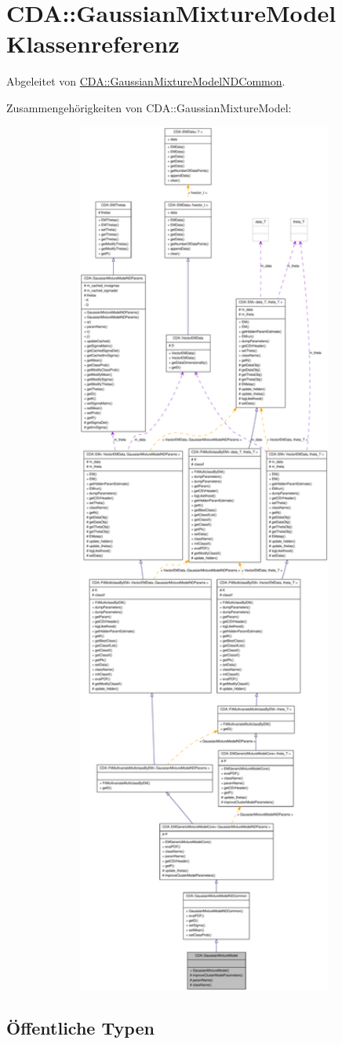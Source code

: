 \hypertarget{classCDA_1_1GaussianMixtureModel}{
\section{CDA::GaussianMixtureModel Klassenreferenz}
\label{classCDA_1_1GaussianMixtureModel}
}


Abgeleitet von \hyperlink{classCDA_1_1GaussianMixtureModelNDCommon}{CDA::GaussianMixtureModelNDCommon}.



Zusammengehörigkeiten von CDA::GaussianMixtureModel:\nopagebreak
\begin{figure}[H]
\begin{center}
\leavevmode
\includegraphics[width=400pt]{classCDA_1_1GaussianMixtureModel__coll__graph}
\end{center}
\end{figure}
\subsection*{Öffentliche Typen}
\begin{DoxyCompactItemize}
\item 
\hypertarget{classCDA_1_1GaussianMixtureModel_a1b5062d5be14d4e057f1cec50561057e}{
typedef GaussianMixtureModelNDCommon::datapoint\_\-t \hyperlink{classCDA_1_1GaussianMixtureModel_a1b5062d5be14d4e057f1cec50561057e}{datapoint\_\-t}}
\label{classCDA
\end{DoxyCompactItemize}
